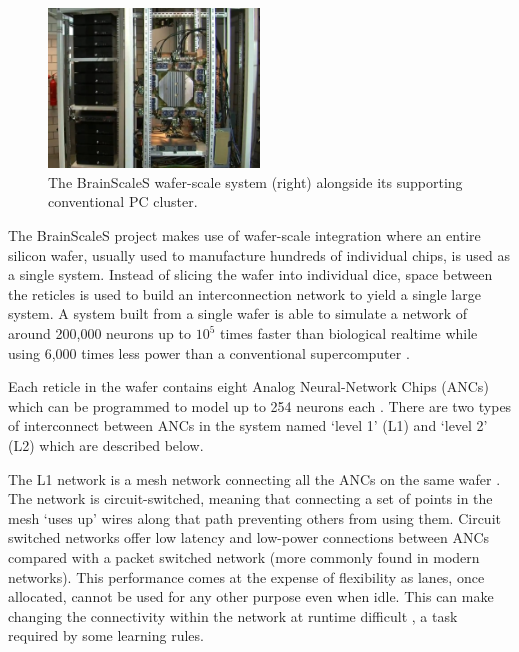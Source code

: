 				\begin{figure}
					\center
					\includegraphics[width=0.5\textwidth]{figures/brainscales}
					
					\caption[The BrainScaleS wafer-scale system.]{The BrainScaleS
					wafer-scale system (right) alongside its supporting conventional PC cluster.}
					
					\label{fig:brainscales}
				\end{figure}
				
				The BrainScaleS project makes use of wafer-scale integration where an
				entire silicon wafer, usually used to manufacture hundreds of individual
				chips, is used as a single system. Instead of slicing the wafer into
				individual dice, space between the reticles is used to build an
				interconnection network to yield a single large system. A system built
				from a single wafer is able to simulate a network of around 200,000
				neurons up to $10^5$ times faster than biological realtime while using
				6,000 times less power than a conventional supercomputer
				\cite{schemmel08}.
				
				Each reticle in the wafer contains eight Analog Neural-Network Chips
				(ANCs) which can be programmed to model up to 254 neurons each
				\cite{schemmel10}. There are two types of interconnect between ANCs in
				the system named `level 1' (L1) and `level 2' (L2) which are described
				below.
			
				The L1 network is a mesh network connecting all the ANCs on the same
				wafer \cite{fieres08}. The network is circuit-switched, meaning that
				connecting a set of points in the mesh `uses up' wires along that path
				preventing others from using them. Circuit switched networks offer low
				latency and low-power connections between ANCs compared with a packet
				switched network (more commonly found in modern networks). This
				performance comes at the expense of flexibility as lanes, once
				allocated, cannot be used for any other purpose even when idle. This can
				make changing the connectivity within the network at runtime difficult
				\cite{dally04}, a task required by some learning rules.
				
